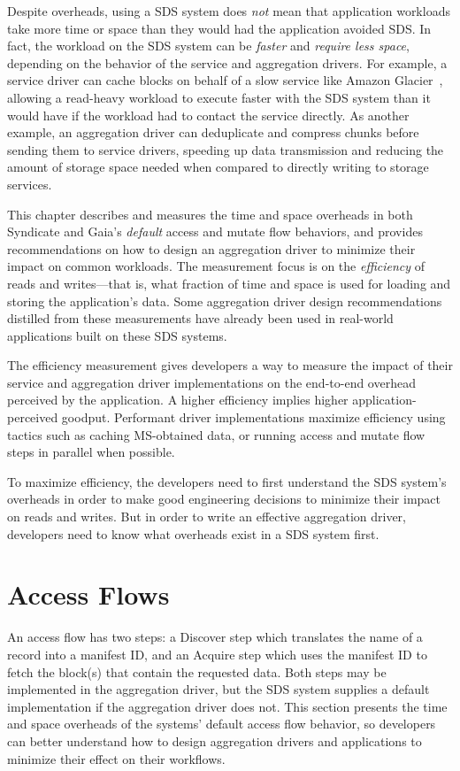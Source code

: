 Despite overheads, using a SDS system does \emph{not} mean that application workloads take more time or
space than they would had the application avoided SDS.  In fact,
the workload on the SDS system can be \emph{faster} and \emph{require less
space}, depending on the behavior of the service and aggregation drivers.
For example, a service driver can cache blocks on behalf of a slow service like Amazon Glacier~\cite{amazon-glacier},
allowing a read-heavy workload to execute faster with the SDS system
than it would have if the workload had to contact the service directly.
As another example, an aggregation driver can deduplicate
and compress chunks before sending them to service drivers, speeding up data
transmission and reducing the amount of storage space needed when compared to
directly writing to storage services.

This chapter describes and measures the time and space overheads in both
Syndicate and Gaia's \emph{default} access and mutate flow behaviors, and
provides recommendations on how to design an aggregation driver to minimize
their impact on common workloads.  The measurement focus is on the
\emph{efficiency} of reads and writes---that is, what fraction of time and space
is used for loading and storing the application's data.
Some aggregation driver design recommendations distilled from
these measurements have already been used in real-world applications built
on these SDS systems.

The efficiency measurement gives developers a way to
measure the impact of their service and aggregation driver implementations on
the end-to-end overhead perceived by the application.
A higher efficiency implies higher application-perceived goodput.  Performant
driver implementations maximize efficiency using tactics such as caching
MS-obtained data, or running access and mutate flow steps in parallel when
possible.

To maximize efficiency, the developers need to first understand the SDS system's
overheads in order to make good engineering decisions to minimize their
impact on reads and writes.  But in order to write an effective aggregation
driver, developers need to know what overheads exist in a SDS system first.

\section{Access Flows}

An access flow has two steps:  a Discover step which translates the
name of a record into a manifest ID, and an Acquire step which uses the manifest
ID to fetch the block(s) that contain the requested data.  Both steps may be
implemented in the aggregation driver, but the SDS system supplies a default
implementation if the aggregation driver does not.
This section presents the time and space overheads of the systems' default
access flow behavior, so developers can better understand how to design
aggregation drivers and applications to minimize their effect on their
workflows.

